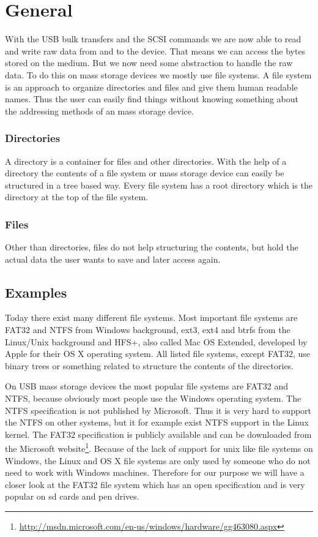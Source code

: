 \section{General}

With the USB bulk transfers and the SCSI commands we are now able to read and write raw data from and to the device. That means we can access the bytes stored on the medium. But we now need some abstraction to handle the raw data. To do this on mass storage devices we mostly use file systems. A file system is an approach to organize directories and files and give them human readable names. Thus the user can easily find things without knowing something about the addressing methods of an mass storage device.

\subsubsection{Directories}

A directory is a container for files and other directories. With the help of a directory the contents of a file system or mass storage device can easily be structured in a tree based way. Every file system has a root directory which is the directory at the top of the file system.

\subsubsection{Files}

Other than directories, files do not help structuring the contents, but hold the actual data the user wants to save and later access again.

\subsection{Examples}

Today there exist many different file systems. Most important file systems are FAT32 and NTFS from Windows background, ext3, ext4 and btrfs from the Linux/Unix background and HFS+, also called Mac OS Extended, developed by Apple for their OS X operating system. All listed file systems, except FAT32, use binary trees or something related to structure the contents of the directories.

On USB mass storage devices the most popular file systems are FAT32 and NTFS, because obviously most people use the Windows operating system. The NTFS specification is not published by Microsoft. Thus it is very hard to support the NTFS on other systems, but it for example exist NTFS support in the Linux kernel. The FAT32 specification is publicly available and can be downloaded from the Microsoft website\footnote{\url{http://msdn.microsoft.com/en-us/windows/hardware/gg463080.aspx}}. Because of the lack of support for unix like file systems on Windows, the Linux and OS X file systems are only used by someone who do not need to work with Windows machines. Therefore for our purpose we will have a closer look at the FAT32 file system which has an open specification and is very popular on sd cards and pen drives.

